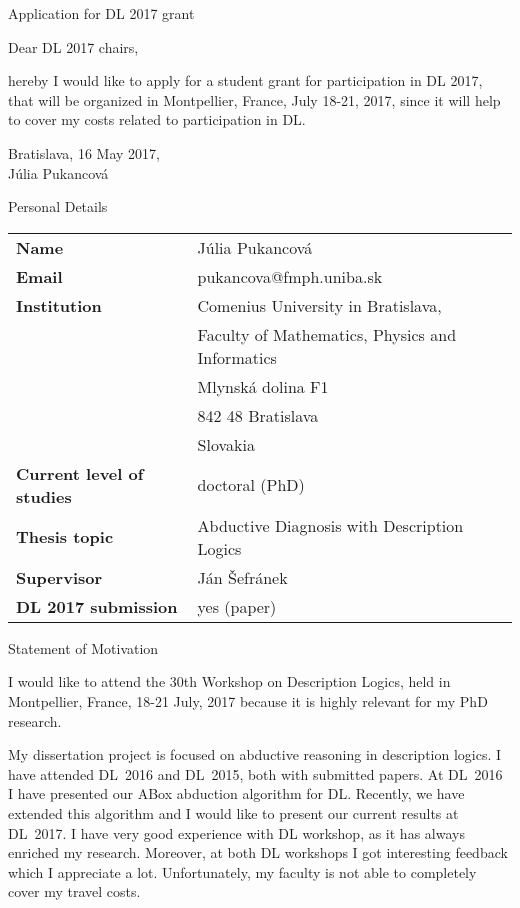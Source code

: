 \documentclass{article}
\begin{document}
\begin{center}
\Large{\sc Application for DL 2017 grant}
\end{center}

\bigskip
\noindent Dear DL 2017 chairs,

\bigskip

\noindent
hereby I would like to apply for a student grant for participation in DL 2017, that will be organized in Montpellier, France, July 18-21, 2017, since it will help to cover my costs related to participation in DL.

\bigskip
\noindent Bratislava, 16 May 2017,\\
J\'{u}lia Pukancov\'{a}

\newpage

\begin{center}
\Large{\sc Personal Details}
\end{center}

\bigskip

\begin{tabular*}{\textwidth}{ l l }
 \textbf{Name} & Júlia Pukancová \\ [1em]
 \textbf{Email} & pukancova@fmph.uniba.sk \\ [1em]
 \textbf{Institution} & Comenius University in Bratislava, \\
 & Faculty of Mathematics, Physics and Informatics \\ 
 & Mlynská dolina F1 \\
 & 842 48 Bratislava\\
 & Slovakia \\[1em]
 \textbf{Current level of studies} & doctoral (PhD) \\[1em]
 \textbf{Thesis topic} & Abductive Diagnosis with Description Logics \\[1em]
 \textbf{Supervisor} & Ján Šefránek \\[1em]
  \textbf{DL 2017 submission} & yes (paper)
\end{tabular*}

\newpage

\begin{center}
\Large{\sc Statement of Motivation}
\end{center}

\bigskip

\noindent
I would like to attend the 30th Workshop  on Description Logics, held in Montpellier, France, 18-21 July, 2017 because it is highly relevant for my PhD research.

My dissertation project is focused on abductive reasoning in description logics. I have attended DL~2016 and DL~2015, both with submitted papers. At DL~2016 I have presented our ABox abduction algorithm for DL. Recently, we have extended this algorithm and I would like to present our current results at DL~2017. I have very good experience with DL workshop, as it has always enriched my research. Moreover, at both DL workshops I got interesting feedback which I appreciate a lot. Unfortunately, my faculty is not able to completely cover my travel costs.
\end{document}
